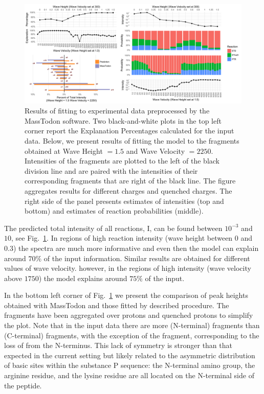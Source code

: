 \documentclass{llncs}
\begin{document}
\begin{figure}[h]
        \center
        \includegraphics[width=1.1\textwidth]{melon.png}
        \caption{ Results of fitting to experimental data preprocessed by the {\sc MassTodon} software. Two black-and-white plots in the top left corner report the Explanation Percentages calculated for the input data. Below, we present results of fitting the model to the fragments obtained at Wave Height $= 1.5$ and Wave Velocity $= 2250$. Intensities of the  fragments are plotted to the left of the black division line and are paired with the intensities of their corresponding  fragments that are right of the black line. The figure aggregates results for different charges and quenched charges. The right side of the panel presents estimates of intensities (top and bottom) and estimates of reaction probabilities (middle).
        }\label{fig::melon}
\end{figure}
The predicted total intensity of all reactions, I, can be found between $10^{-3}$ and $10$, see Fig.~\ref{fig::melon}. In regions of high reaction intensity (wave height between $0$ and $0.3$) the spectra are much more informative and even then the model can explain around $70\%$ of the input information. Similar results are obtained for different values of wave velocity. however, in the regions of high intensity (wave velocity above $1750$) the model explains around $75\%$ of the input.

In the bottom left corner of Fig.~\ref{fig::melon} we present the comparison of peak heights obtained with {\sc MassTodon} and those fitted by described procedure. The fragments have been aggregated over protons and quenched protons to simplify the plot. Note that in the input data there are more (N-terminal)  fragments than (C-terminal)  fragments, with the exception of the  fragment, corresponding to the loss of  from the N-terminus. This lack of symmetry is stronger than that expected in the current setting but likely related to the asymmetric distribution of basic sites within the substance P sequence: the N-terminal amino group, the arginine residue, and the lysine residue are all located on the N-terminal side of the peptide.
\end{document}
